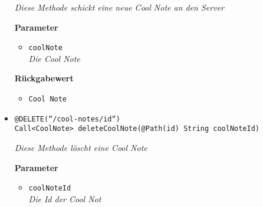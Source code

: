 \begin{itemize}
		\textit{Diese Methode schickt eine neue Cool Note an den Server }

		\textbf{Parameter} 
			\begin{itemize}
				\item\texttt{coolNote}\\
		 		\textit{Die Cool Note}
	 		\end{itemize}

		\textbf{Rückgabewert} 
		\begin{itemize}
				\item\texttt{Cool Note}
	 		\end{itemize}

      \item\texttt{{@DELETE(``/cool-notes/{id}``)\\ Call<CoolNote> deleteCoolNote(@Path(\grqq id\grqq) String coolNoteId)}}

		\textit{Diese Methode löscht eine Cool Note }

	\textbf{Parameter} 
			\begin{itemize}
				\item\texttt{coolNoteId}\\
		 		\textit{Die Id der Cool Not}
	 		\end{itemize}

	 \end{itemize}


